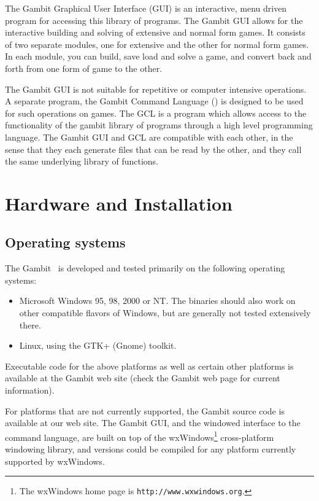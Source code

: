 \documentclass[12pt]{report}
\begin{document}
The Gambit Graphical User Interface (GUI) is an
interactive, menu driven program for accessing this library of programs.
The Gambit GUI allows for the interactive building and solving of
extensive and normal form games.  It consists of two separate modules, one
for extensive and the other for normal form games.   In each module, you
can build, save load and solve a game, and convert back and forth from one
form of game to the other.

The Gambit GUI is not suitable for repetitive or
computer intensive  operations.  A separate program, the Gambit Command
Language () is designed to be used for such operations 
on games.  The
GCL is a program which allows access to the functionality of the gambit
library of programs through a high level programming language.  The
Gambit GUI and GCL  are compatible with each other, in the sense that they
each generate files that can be read by the other, and they call the same
underlying library of functions.


\chapter{Hardware and Installation}
\section{Operating systems}
The Gambit \ is developed and tested primarily
on the following operating systems:
\begin{itemize}
\item Microsoft Windows 95, 98, 2000 or NT.  The binaries should also
work on other compatible flavors of Windows, but are generally not tested
extensively there.
\item Linux, using the GTK+ (Gnome) toolkit.  
\end{itemize}

Executable code for the above platforms as well as certain other
platforms is available at the Gambit web site (check the Gambit web
page for current information).

For platforms that are not currently supported, the Gambit source code
is available at our web site.  The Gambit GUI, and the windowed interface 
to the command language, are built on top of the wxWindows\footnote{The
wxWindows home page is \texttt{http://www.wxwindows.org}.} cross-platform
windowing library, and versions could be compiled for any platform currently
supported by wxWindows.
\end{document}
